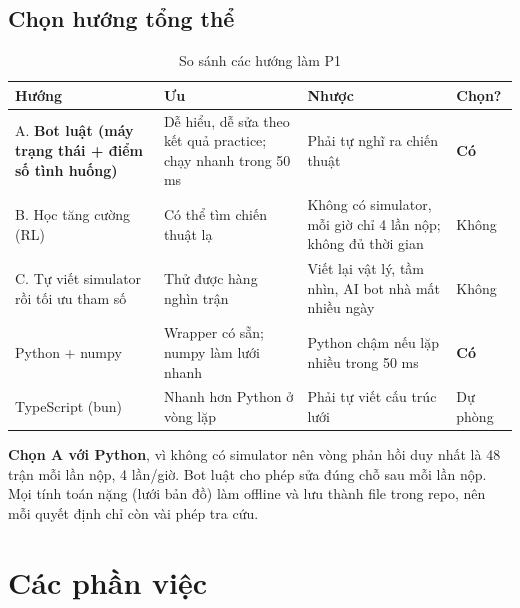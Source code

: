 \documentclass[a4paper,12pt]{article}
\newcommand{\fn}[1]{\texttt{\detokenize{#1}}}
\begin{document}
\subsection{Chọn hướng tổng thể}
\begin{table}[H]
\centering\small
\begin{tabularx}{\textwidth}{L{3.3cm}YYC{1.5cm}}
\toprule
\textbf{Hướng} & \textbf{Ưu} & \textbf{Nhược} & \textbf{Chọn?} \\
\midrule
A. \textbf{Bot luật (máy trạng thái + điểm số tình huống)} & Dễ hiểu, dễ sửa theo kết quả practice; chạy nhanh trong 50 ms & Phải tự nghĩ ra chiến thuật & \textbf{Có} \\
B. Học tăng cường (RL) & Có thể tìm chiến thuật lạ & Không có simulator, mỗi giờ chỉ 4 lần nộp; không đủ thời gian & Không \\
C. Tự viết simulator rồi tối ưu tham số & Thử được hàng nghìn trận & Viết lại vật lý, tầm nhìn, AI bot nhà mất nhiều ngày & Không \\
\midrule
Python + numpy & Wrapper có sẵn; numpy làm lưới nhanh & Python chậm nếu lặp nhiều trong 50 ms & \textbf{Có} \\
TypeScript (bun) & Nhanh hơn Python ở vòng lặp & Phải tự viết cấu trúc lưới & Dự phòng \\
\bottomrule
\end{tabularx}
\caption{So sánh các hướng làm P1}
\end{table}

\textbf{Chọn A với Python}, vì không có simulator nên vòng phản hồi duy nhất là 48 trận mỗi lần nộp, 4 lần/giờ. Bot luật cho phép sửa đúng chỗ sau mỗi lần nộp. Mọi tính toán nặng (lưới bản đồ) làm offline và lưu thành file \fn{.npy} trong repo, nên mỗi quyết định chỉ còn vài phép tra cứu.

\newpage
\section{Các phần việc}

\end{document}

